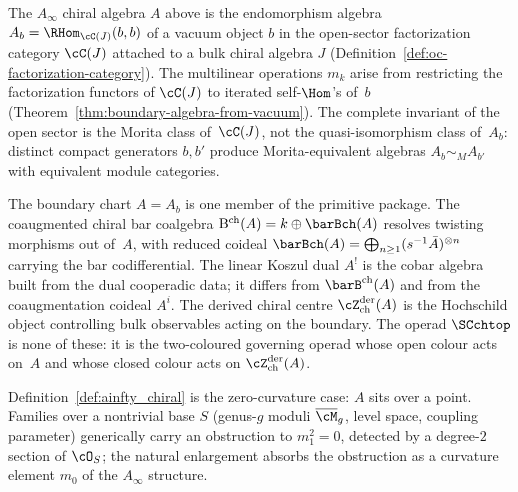 \begin{remark}
\label{rem:categorical-origin}
The $A_\infty$ chiral algebra $A$ above is the endomorphism algebra $A_b = \RHom_{\cC(J)}(b,b)$ of a vacuum object $b$ in the open-sector factorization category $\cC(J)$ attached to a bulk chiral algebra $J$ (Definition~\ref{def:oc-factorization-category}). The multilinear operations $m_k$ arise from restricting the factorization functors of $\cC(J)$ to iterated self-$\Hom$'s of~$b$ (Theorem~\ref{thm:boundary-algebra-from-vacuum}). The complete invariant of the open sector is the Morita class of~$\cC(J)$, not the quasi-isomorphism class of~$A_b$: distinct compact generators $b, b'$ produce Morita-equivalent algebras $A_b \sim_M A_{b'}$ with equivalent module categories.
\end{remark}

\begin{remark}
\label{rem:five-primitive-objects-axioms}
The boundary chart $A=A_b$ is one member of the primitive package.
The coaugmented chiral bar coalgebra
$\mathrm B^{\mathrm{ch}}(A)=k\oplus\barBch(A)$ resolves twisting
morphisms out of~$A$, with reduced coideal
$\barBch(A)=\bigoplus_{n\ge1}(s^{-1}\bar A)^{\otimes n}$ carrying the
bar codifferential. The linear Koszul dual $A^!$ is the cobar algebra built
from the dual cooperadic data; it differs from $\barB^{\mathrm{ch}}(A)$
and from the coaugmentation coideal $A^i$. The derived chiral centre
$\cZ^{\mathrm{der}}_{\mathrm{ch}}(A)$ is the Hochschild object
controlling bulk observables acting on the boundary. The operad
$\SCchtop$ is none of these: it is the two-coloured governing
operad whose open colour acts on~$A$ and whose closed colour acts
on $\cZ^{\mathrm{der}}_{\mathrm{ch}}(A)$.
\end{remark}

Definition~\ref{def:ainfty_chiral} is the zero-curvature case: $A$
sits over a point. Families over a nontrivial base $S$ (genus-$g$
moduli $\overline{\cM}_g$, level space, coupling parameter)
generically carry an obstruction to $m_1^2 = 0$, detected by a
degree-$2$ section of $\cO_S$; the natural enlargement absorbs the
obstruction as a curvature element $m_0$ of the $A_\infty$
structure.

